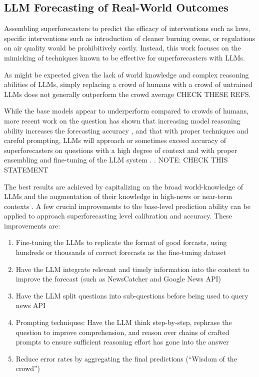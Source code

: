 \documentclass[12pt,a4paper]{article}
\begin{document}
\subsection{LLM Forecasting of Real-World Outcomes}

Assembling superforecasters to predict the efficacy of interventions such as laws, specific interventions such as introduction of cleaner burning ovens, or regulations on air quality would be prohibitively costly. Instead, this work focuses on the mimicking of techniques known to be effective for superforecasters with LLMs. 

As might be expected given the lack of world knowledge and complex reasoning abilities of LLMs, simply replacing a crowd of humans with a crowd of untrained LLMs does not generally outperform the crowd average   CHECK THESE REFS.

While the base models appear to underperform compared to crowds of humans, more recent work on the question has shown that increasing model reasoning ability increases the forecasting accuracy , and that with proper techniques and careful prompting, LLMs will approach or sometimes exceed accuracy of superforecasters on questions with a high degree of context and with proper ensembling and fine-tuning of the LLM system .   .  NOTE: CHECK THIS STATEMENT

The best results are achieved by capitalizing on the broad world-knowledge of LLMs and the augmentation of their knowledge in high-news or near-term contexts . A few crucial improvements to the base-level prediction ability can be applied to approach superforecasting level calibration and accuracy. These improvements are: 
\begin{enumerate}
\item Fine-tuning the LLMs to replicate the format of good forcasts, using hundreds or thousands of correct forecasts as the fine-tuning dataset
\item Have the LLM integrate relevant and timely information into the context to improve the forecast (such as NewsCatcher and Google News API)
\item Have the LLM split questions into sub-questions before being used to query news API
\item Prompting techniques: Have the LLM think step-by-step, rephrase the question to improve comprehension, and reason over chains of crafted prompts to ensure sufficient reasoning effort has gone into the answer
\item Reduce error rates by aggregating the final predictions (``Wisdom of the crowd'')
\end{enumerate}
\end{document}
